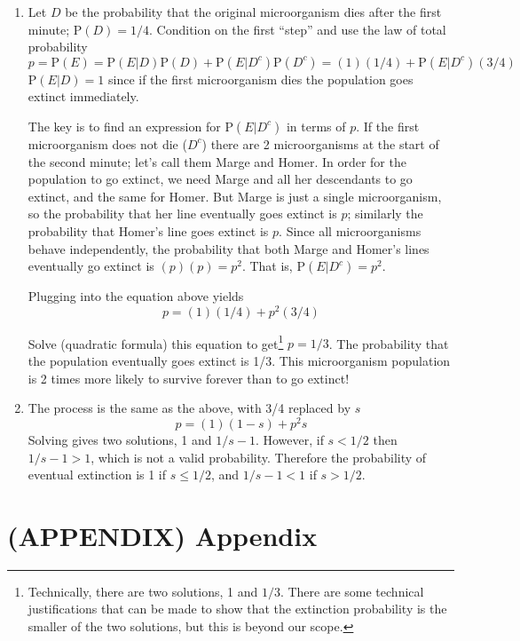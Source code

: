 \documentclass[
  letterpaper,
  DIV=11,
  numbers=noendperiod]{scrreprt}
\theoremstyle{plain}
\theoremstyle{definition}
\theoremstyle{definition}
\theoremstyle{definition}
\theoremstyle{remark}
\begin{document}
\begin{enumerate}
\def\labelenumi{\arabic{enumi}.}
\item
  Let \(D\) be the probability that the original microorganism dies
  after the first minute; \(\textrm{P}(D) = 1/4\). Condition on the
  first ``step'' and use the law of total probability \[
  p = \textrm{P}(E) = \textrm{P}(E|D)\textrm{P}(D) + \textrm{P}(E|D^c)\textrm{P}(D^c) = (1)(1/4) + \textrm{P}(E|D^c)(3/4)
  \] \(\textrm{P}(E|D) = 1\) since if the first microorganism dies the
  population goes extinct immediately.

  The key is to find an expression for \(\textrm{P}(E|D^c)\) in terms of
  \(p\). If the first microorganism does not die (\(D^c\)) there are 2
  microorganisms at the start of the second minute; let's call them
  Marge and Homer. In order for the population to go extinct, we need
  Marge and all her descendants to go extinct, and the same for Homer.
  But Marge is just a single microorganism, so the probability that her
  line eventually goes extinct is \(p\); similarly the probability that
  Homer's line goes extinct is \(p\). Since all microorganisms behave
  independently, the probability that both Marge and Homer's lines
  eventually go extinct is \((p)(p)=p^2\). That is,
  \(\textrm{P}(E | D^c) = p^2\).

  Plugging into the equation above yields \[
  p = (1)(1/4) + p^2(3/4)
  \]

  Solve (quadratic formula) this equation to get\footnote{Technically,
    there are two solutions, 1 and \(1/3\). There are some technical
    justifications that can be made to show that the extinction
    probability is the smaller of the two solutions, but this is beyond
    our scope.} \(p= 1/3\). The probability that the population
  eventually goes extinct is 1/3. This microorganism population is 2
  times more likely to survive forever than to go extinct!
\item
  The process is the same as the above, with 3/4 replaced by \(s\) \[
  p = (1)(1-s) + p^2s
  \] Solving gives two solutions, 1 and \(1/s - 1\). However, if
  \(s<1/2\) then \(1/s - 1 > 1\), which is not a valid probability.
  Therefore the probability of eventual extinction is 1 if
  \(s \le 1/2\), and \(1/s - 1<1\) if \(s > 1/2\).
\end{enumerate}


\chapter*{(APPENDIX) Appendix}\label{appendix-appendix}
\end{document}
